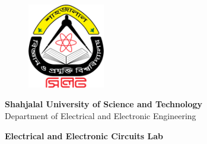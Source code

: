 \documentclass[a4paper,12pt]{report}
\begin{document}
\begin{titlepage}

    \begin{center}
        
        \begin{figure}[H]  %
            \centering
            \vspace{2cm}
            \includegraphics[width=0.3\textwidth]{img/sust.png} %
            \vspace{1cm}
        \end{figure}
        
        
        {\fontsize{18pt}{20pt} \textbf{Shahjalal University of Science and Technology}} \\ [0.5cm]
        
        {\fontsize{18pt}{20pt} \selectfont Department of Electrical and Electronic Engineering} \\ [0.5cm]

        \begin{tcolorbox}[colback=gray!10, colframe=white, boxrule=0pt, left=0mm, right=0mm, arc=0mm, boxsep=8pt]
            \centering
            {\fontsize{16pt}{20pt}\selectfont \textbf{Electrical and Electronic Circuits Lab}}
        \end{tcolorbox}
        
        \vfill
    \end{center}

    
\end{titlepage}

\setcounter{tocdepth}{1}  %
\renewcommand{\contentsname}{List of Experiments}
\tableofcontents


\newpage












\newpage


\end{document}

